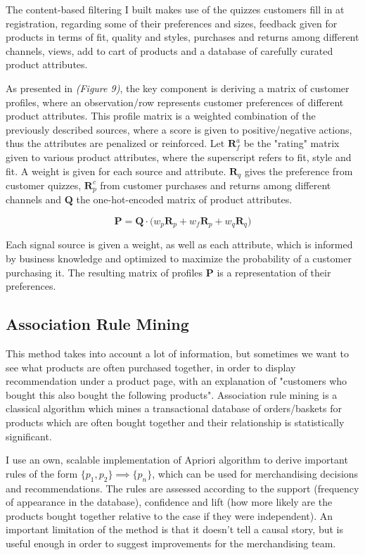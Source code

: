 \documentclass[12pt]{article}
\begin{document}
The content-based filtering I built makes use of the quizzes customers fill in at registration, regarding some of their preferences and sizes, feedback given for products in terms of fit, quality and styles, purchases and returns among different channels, views, add to cart of products and a database of carefully curated product attributes.

As presented in \textit{(Figure 9)}, the key component is deriving a matrix of customer profiles, where an observation/row represents customer preferences of different product attributes. This profile matrix is a weighted combination of the previously described sources, where a score is given to positive/negative actions, thus the attributes are penalized or reinforced. Let $\mathbf{R}^a_f$ be the "rating" matrix given to various product attributes, where the superscript refers to fit, style and fit. A weight is given for each source and attribute. $\mathbf{R}_q$ gives the preference from customer quizzes, $\mathbf{R}^c_p$ from customer purchases and returns among different channels and $\mathbf{Q}$ the one-hot-encoded matrix of product attributes.

\begin{equation}
	\mathbf{P} = \mathbf{Q} \cdot \big( w_p  \mathbf{R}_p + w_f \mathbf{R}_p + w_q \mathbf{R}_q  \big)
\end{equation}

Each signal source is given a weight, as well as each attribute, which is informed by business knowledge and optimized to maximize the probability of a customer purchasing it. The resulting matrix of profiles $\mathbf{P}$ is a representation of their preferences.


\subsection{Association Rule Mining}

This method takes into account a lot of information, but sometimes we want to see what products are often purchased together, in order to display recommendation under a product page, with an explanation of "customers who bought this also bought the following products". Association rule mining is a classical algorithm which mines a transactional database of orders/baskets for products which are often bought together and their relationship is statistically significant.

I use an own, scalable implementation of Apriori algorithm to derive important rules of the form $\{ p_1, p_2 \} \implies \{ p_n \}$, which can be used for merchandising decisions and recommendations. The rules are assessed according to the support (frequency of appearance in the database), confidence and lift (how more likely are the products bought together relative to the case if they were independent). An important limitation of the method is that it doesn't tell a causal story, but is useful enough in order to suggest improvements for the merchandising team.
\end{document}

